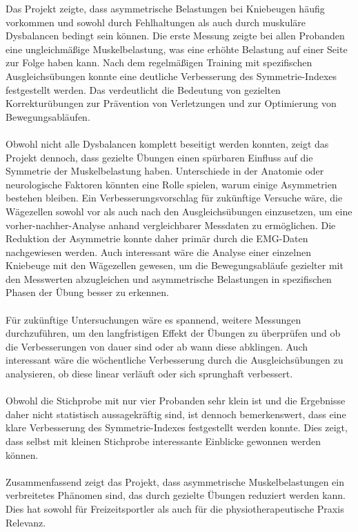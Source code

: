 Das Projekt zeigte, dass asymmetrische Belastungen bei Kniebeugen häufig vorkommen und sowohl durch Fehlhaltungen als auch durch muskuläre Dysbalancen bedingt sein können. 
Die erste Messung zeigte bei allen Probanden eine ungleichmäßige Muskelbelastung, was eine erhöhte Belastung auf einer Seite zur Folge haben kann. 
Nach dem regelmäßigen Training mit spezifischen Ausgleichsübungen konnte eine deutliche Verbesserung des Symmetrie-Indexes festgestellt werden. 
Das verdeutlicht die Bedeutung von gezielten Korrekturübungen zur Prävention von Verletzungen und zur Optimierung von Bewegungsabläufen.\\
\\
Obwohl nicht alle Dysbalancen komplett beseitigt werden konnten, zeigt das Projekt dennoch, dass gezielte Übungen einen spürbaren Einfluss auf die Symmetrie der Muskelbelastung haben. Unterschiede in der Anatomie oder neurologische Faktoren könnten eine Rolle spielen, warum einige Asymmetrien bestehen bleiben.
Ein Verbesserungsvorschlag für zukünftige Versuche wäre, die Wägezellen sowohl vor als auch nach den Ausgleichsübungen einzusetzen, um eine vorher-nachher-Analyse anhand vergleichbarer Messdaten zu ermöglichen. 
Die Reduktion der Asymmetrie konnte daher primär durch die EMG-Daten nachgewiesen werden. 
Auch interessant wäre die Analyse einer einzelnen Kniebeuge mit den Wägezellen gewesen,  um die Bewegungsabläufe gezielter mit den Messwerten abzugleichen und asymmetrische Belastungen in spezifischen Phasen der Übung besser zu erkennen.\\
\\
Für zukünftige Untersuchungen wäre es spannend, weitere Messungen durchzuführen, um den langfristigen Effekt der Übungen zu überprüfen und ob die Verbesserungen von dauer sind oder ab wann diese abklingen. 
Auch interessant wäre die wöchentliche Verbesserung durch die Ausgleichsübungen zu analysieren, ob diese linear verläuft oder sich sprunghaft verbessert. \\
\\
Obwohl die Stichprobe mit nur vier Probanden sehr klein ist und die Ergebnisse daher nicht statistisch aussagekräftig sind, ist dennoch bemerkenswert, dass eine klare Verbesserung des Symmetrie-Indexes festgestellt werden konnte. 
Dies zeigt, dass selbst mit kleinen Stichprobe interessante Einblicke gewonnen werden können.
\\
\\
Zusammenfassend zeigt das Projekt, dass asymmetrische Muskelbelastungen ein verbreitetes Phänomen sind, das durch gezielte Übungen reduziert werden kann. Dies hat sowohl für Freizeitsportler als auch für die physiotherapeutische Praxis Relevanz.